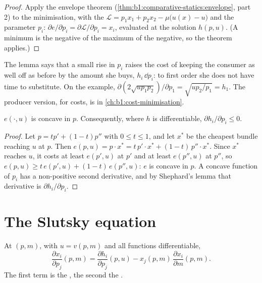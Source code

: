 \begin{proof}
Apply the envelope theorem (\cref{thm:b1:comparative-statics:envelope},
part 2) to the minimisation, with the 
$\mathcal L = p_1x_1 + p_2x_2 - \mu\bigl(u(x) - u\bigr)$ and the parameter $p_i$:
$\partial e/\partial p_i = \partial\mathcal L/\partial p_i = x_i$, evaluated at
the solution $h(p, u)$. (A minimum is the negative of the maximum of the
negative, so the theorem applies.)
\end{proof}

The lemma says that a small rise in $p_i$ raises the cost of keeping the
consumer as well off as before by the amount she buys, $h_i\,\dd p_i$: to
first order she does not have time to substitute. On the example,
$\partial(2\sqrt{u p_1p_2})/\partial p_1 = \sqrt{u p_2/p_1} = h_1$. The producer
version, for costs, is in \cref{ch:b1:cost-minimisation}.

\begin{proposition}\label{prop:b1:income-and-substitution-effects:negative}
$e(\cdot, u)$ is concave in $p$. Consequently, where $h$ is differentiable,
$\partial h_i/\partial p_i \le 0$.
\end{proposition}

\begin{proof}
Let $p = tp' + (1 - t)p''$ with $0 \le t \le 1$, and let $x^*$ be the cheapest
bundle reaching $u$ at $p$. Then
$e(p, u) = p\cdot x^* = t\,p'\cdot x^* + (1 - t)\,p''\cdot x^*$. Since $x^*$
reaches $u$, it costs at least $e(p', u)$ at $p'$ and at least $e(p'', u)$ at
$p''$, so $e(p, u) \ge t\,e(p', u) + (1 - t)\,e(p'', u)$: $e$ is concave in $p$.
A concave function of $p_i$ has a non-positive second derivative, and by
Shephard's lemma that derivative is $\partial h_i/\partial p_i$.
\end{proof}

\section{The Slutsky equation}\label{sec:b1:income-and-substitution-effects:slutsky}

\begin{theorem}\label{thm:b1:income-and-substitution-effects:slutsky}
At $(p, m)$, with $u = v(p, m)$ and all functions differentiable,
\[
\frac{\partial x_i}{\partial p_j}(p, m) = \frac{\partial h_i}{\partial p_j}(p, u) - x_j(p, m)\,\frac{\partial x_i}{\partial m}(p, m).
\]
The first term is the , the second the .
\end{theorem}

